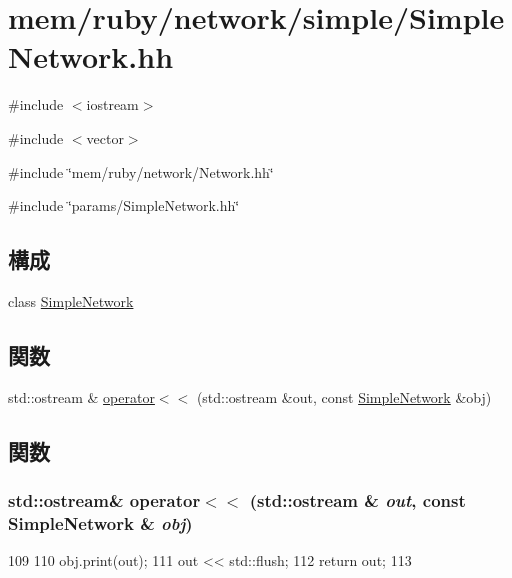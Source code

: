 \hypertarget{SimpleNetwork_8hh}{
\section{mem/ruby/network/simple/SimpleNetwork.hh}
\label{SimpleNetwork_8hh}
}
{\ttfamily \#include $<$iostream$>$}\par
{\ttfamily \#include $<$vector$>$}\par
{\ttfamily \#include \char`\"{}mem/ruby/network/Network.hh\char`\"{}}\par
{\ttfamily \#include \char`\"{}params/SimpleNetwork.hh\char`\"{}}\par
\subsection*{構成}
\begin{DoxyCompactItemize}
\item 
class \hyperlink{classSimpleNetwork}{SimpleNetwork}
\end{DoxyCompactItemize}
\subsection*{関数}
\begin{DoxyCompactItemize}
\item 
std::ostream \& \hyperlink{SimpleNetwork_8hh_a50e71a1769e6f0d4fe2713d74ee45323}{operator$<$$<$} (std::ostream \&out, const \hyperlink{classSimpleNetwork}{SimpleNetwork} \&obj)
\end{DoxyCompactItemize}


\subsection{関数}
\hypertarget{SimpleNetwork_8hh_a50e71a1769e6f0d4fe2713d74ee45323}{
\subsubsection[{operator$<$$<$}]{\setlength{\rightskip}{0pt plus 5cm}std::ostream\& operator$<$$<$ (std::ostream \& {\em out}, \/  const {\bf SimpleNetwork} \& {\em obj})}}
\label{SimpleNetwork_8hh_a50e71a1769e6f0d4fe2713d74ee45323}



\begin{DoxyCode}
109 {
110     obj.print(out);
111     out << std::flush;
112     return out;
113 }
\end{DoxyCode}
